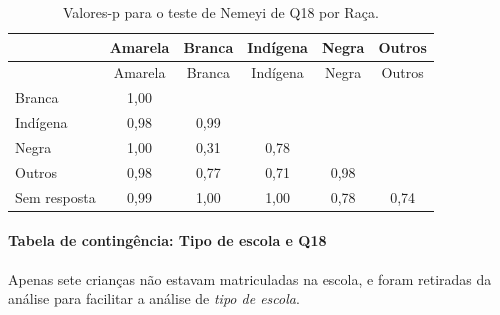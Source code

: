 \documentclass[]{article}
\let\oldparagraph\paragraph
\renewcommand{\paragraph}[1]{\oldparagraph{#1}\mbox{}}
\begin{document}
\begin{longtable}[]{@{}lccccc@{}}
\caption{\label{tab:unnamed-chunk-288}Valores-p para o teste de Nemeyi de Q18 por Raça.}\tabularnewline
\toprule
& Amarela & Branca & Indígena & Negra & Outros\tabularnewline
\midrule
\endfirsthead
\toprule
& Amarela & Branca & Indígena & Negra & Outros\tabularnewline
\midrule
\endhead
Branca & 1,00 & & & &\tabularnewline
Indígena & 0,98 & 0,99 & & &\tabularnewline
Negra & 1,00 & 0,31 & 0,78 & &\tabularnewline
Outros & 0,98 & 0,77 & 0,71 & 0,98 &\tabularnewline
Sem resposta & 0,99 & 1,00 & 1,00 & 0,78 & 0,74\tabularnewline
\bottomrule
\end{longtable}

\cleardoublepage

\hypertarget{tabela-de-continguxeancia-tipo-de-escola-e-q18}{%
\paragraph{Tabela de contingência: Tipo de escola e Q18}\label{tabela-de-continguxeancia-tipo-de-escola-e-q18}}

Apenas sete crianças não estavam matriculadas na escola, e foram retiradas da análise para facilitar a análise de \emph{tipo de escola}.
\end{document}

